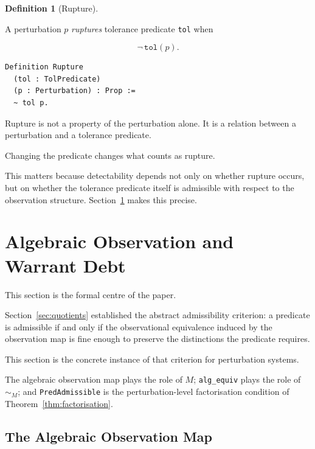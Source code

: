 \documentclass[12pt]{article}
\theoremstyle{plain}
\theoremstyle{definition}
\newtheorem{definition}[theorem]{Definition}
\theoremstyle{remark}
\begin{document}
\begin{definition}[Rupture]
\label{def:rupture}

A perturbation $p$ \emph{ruptures} tolerance predicate
\texttt{tol} when

\[
\neg\,\mathtt{tol}(p).
\]

\end{definition}

\begin{lstlisting}[style=rocq,
caption={Rupture.}]
Definition Rupture
  (tol : TolPredicate)
  (p : Perturbation) : Prop :=
  ~ tol p.
\end{lstlisting}

Rupture is not a property of the perturbation alone.
It is a relation between a perturbation and a tolerance predicate.

Changing the predicate changes what counts as rupture.

This matters because detectability depends not only on whether rupture
occurs, but on whether the tolerance predicate itself is admissible
with respect to the observation structure.
Section~\ref{sec:warrant} makes this precise.

\section{Algebraic Observation and Warrant Debt}
\label{sec:warrant}

This section is the formal centre of the paper.

Section~\ref{sec:quotients} established the abstract admissibility
criterion: a predicate is admissible if and only if the observational
equivalence induced by the observation map is fine enough to preserve
the distinctions the predicate requires.

This section is the concrete instance of that criterion for
perturbation systems.

The algebraic observation map plays the role of $M$; \texttt{alg\_equiv}
plays the role of $\sim_M$; and \texttt{PredAdmissible} is the
perturbation-level factorisation condition of
Theorem~\ref{thm:factorisation}.

\subsection{The Algebraic Observation Map}
\end{document}
